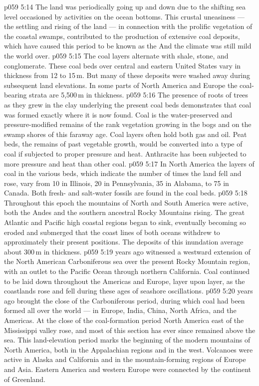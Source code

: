 \vs p059 5:14 The land was periodically going up and down due to the shifting sea level occasioned by activities on the ocean bottoms. This crustal uneasiness --- the settling and rising of the land --- in connection with the prolific vegetation of the coastal swamps, contributed to the production of extensive coal deposits, which have caused this period to be known as the  And the climate was still mild the world over.
\vs p059 5:15 The coal layers alternate with shale, stone, and conglomerate. These coal beds over central and eastern United States vary in thickness from 12 to 15\,m. But many of these deposits were washed away during subsequent land elevations. In some parts of North America and Europe the coal\hyp{}bearing strata are 5,500\,m in thickness.
\vs p059 5:16 The presence of roots of trees as they grew in the clay underlying the present coal beds demonstrates that coal was formed exactly where it is now found. Coal is the water\hyp{}preserved and pressure\hyp{}modified remains of the rank vegetation growing in the bogs and on the swamp shores of this faraway age. Coal layers often hold both gas and oil. Peat beds, the remains of past vegetable growth, would be converted into a type of coal if subjected to proper pressure and heat. Anthracite has been subjected to more pressure and heat than other coal.
\vs p059 5:17 In North America the layers of coal in the various beds, which indicate the number of times the land fell and rose, vary from 10 in Illinois, 20 in Pennsylvania, 35 in Alabama, to 75 in Canada. Both fresh\hyp{} and salt\hyp{}water fossils are found in the coal beds.
\vs p059 5:18 Throughout this epoch the mountains of North and South America were active, both the Andes and the southern ancestral Rocky Mountains rising. The great Atlantic and Pacific high coastal regions began to sink, eventually becoming so eroded and submerged that the coast lines of both oceans withdrew to approximately their present positions. The deposits of this inundation average about 300\,m in thickness.
\vs p059 5:19 \pc {} years ago witnessed a westward extension of the North American Carboniferous sea over the present Rocky Mountain region, with an outlet to the Pacific Ocean through northern California. Coal continued to be laid down throughout the Americas and Europe, layer upon layer, as the coastlands rose and fell during these ages of seashore oscillations.
\vs p059 5:20 \pc {} years ago brought the close of the Carboniferous period, during which coal had been formed all over the world --- in Europe, India, China, North Africa, and the Americas. At the close of the coal\hyp{}formation period North America east of the Mississippi valley rose, and most of this section has ever since remained above the sea. This land\hyp{}elevation period marks the beginning of the modern mountains of North America, both in the Appalachian regions and in the west. Volcanoes were active in Alaska and California and in the mountain\hyp{}forming regions of Europe and Asia. Eastern America and western Europe were connected by the continent of Greenland.
